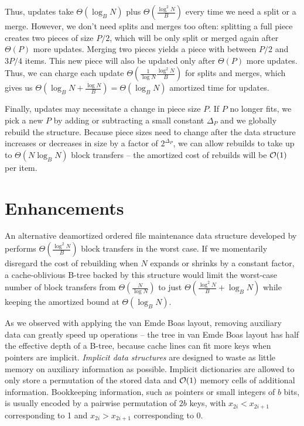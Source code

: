 Thus, updates take $\Theta(\log_B N)$ plus $\Theta(\frac{\log^2 N}{B})$
every time we need a split or a merge. However, we don't need splits and
merges too often: splitting a full piece creates two pieces of size $P/2$,
which will be only split or merged again after $\Theta(P)$ more updates.
Merging two pieces yields a piece with between $P/2$ and $3P/4$ items.
This new piece will also be updated only after $\Theta(P)$ more updates.
Thus, we can charge each update $\Theta(\frac{1}{\log N}\frac{\log^2 N}{B})$
for splits and merges, which gives us $\Theta(\log_B N+\frac{\log N}{B})=
\Theta(\log_B N)$ amortized time for updates.

Finally, updates may necessitate a change in piece size $P$. If $P$
no longer fits, we pick a new $P$ by adding or subtracting a small constant
$\Delta_P$ and we globally rebuild the structure.
Because piece sizes need to change after the data structure increases
or decreases in size by a factor of $2^{\Delta_P}$, we can allow
rebuilds to take up to $\Theta(N\log_B N)$ block transfers -- the amortized
cost of rebuilds will be $\mathcal{O}(1)$ per item.

\section{Enhancements}
An alternative deamortized ordered file maintenance data structure
developed by \cite{willard92} performs $\Theta(\frac{\log^2 N}{B})$
block transfers in the worst case. If we momentarily disregard the cost of
rebuilding when $N$ expands or shrinks by a constant factor, a cache-oblivious
B-tree backed by this structure would limit the worst-case number of block
transfers from $\Theta(\frac{N}{\log N})$ to just
$\Theta(\frac{\log^2 N}{B}+\log_B N)$ while keeping the amortized bound
at $\Theta(\log_B N)$.

As we observed with applying the van Emde Boas layout, removing auxiliary
data can greatly speed up operations -- the tree in van Emde Boas layout has
half the effective depth of a B-tree, because cache lines can fit more keys
when pointers are implicit.
\emph{Implicit data structures} are designed to waste as little memory on
auxiliary information as possible. Implicit dictionaries are allowed to only
store a permutation of the stored data and $\mathcal{O}(1)$ memory cells of additional
information. Bookkeeping information, such as pointers or small integers
of $b$ bits, is usually encoded by a pairwise permutation of $2b$ keys,
with $x_{2i} < x_{2i+1}$ corresponding to 1 and $x_{2i} > x_{2i+1}$
corresponding to 0.


